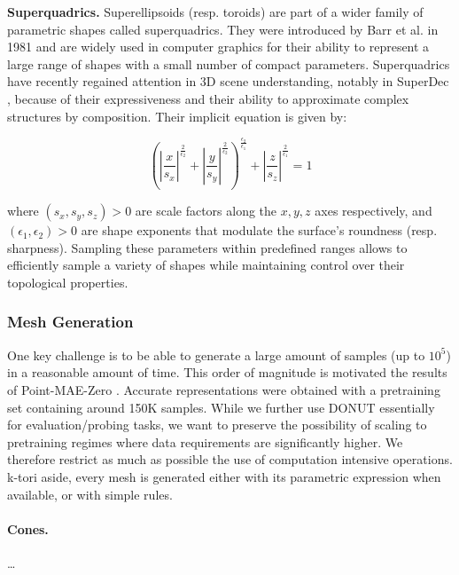 \textbf{Superquadrics.} Superellipsoids  (resp. toroids) are part of a wider family of parametric shapes called superquadrics. They were introduced by Barr et al. \cite{superquadrics} in 1981 and are widely used in computer graphics for their ability to represent a large range of shapes with a small number of compact parameters. Superquadrics have recently regained attention in 3D scene understanding, notably in SuperDec \cite{superdec}, because of their expressiveness and their ability to approximate complex structures by composition. Their implicit equation is given by:

\begin{equation}
\left( \left| \frac{x}{s_x} \right|^{\tfrac{2}{\epsilon_2}}
     + \left| \frac{y}{s_y} \right|^{\tfrac{2}{\epsilon_2}} \right)^{\tfrac{\epsilon_2}{\epsilon_1}}
+ \left| \frac{z}{s_z} \right|^{\tfrac{2}{\epsilon_1}}
= 1
\end{equation}

where $(s_x, s_y, s_z) > 0$ are scale factors along the $x, y, z$ axes respectively, and $(\epsilon_1, \epsilon_2) > 0$ are shape exponents that modulate the surface's roundness (resp. sharpness). Sampling these parameters within predefined ranges allows to efficiently sample a variety of shapes while maintaining control over their topological properties.

\subsubsection{Mesh Generation}
\label{sssec:mesh-generation}

One key challenge is to be able to generate a large amount of samples (up to $10^5$) in a reasonable amount of time. This order of magnitude is motivated the results of Point-MAE-Zero \cite{pmaezero}. Accurate representations were obtained with a pretraining set containing around 150K samples. While we further use DONUT essentially for evaluation/probing tasks, we want to preserve the possibility of scaling to pretraining regimes where data requirements are significantly higher. We therefore restrict as much as possible the use of computation intensive operations. k-tori aside, every mesh is generated either with its parametric expression when available, or with simple rules.

\paragraph{Cones.} \dots


